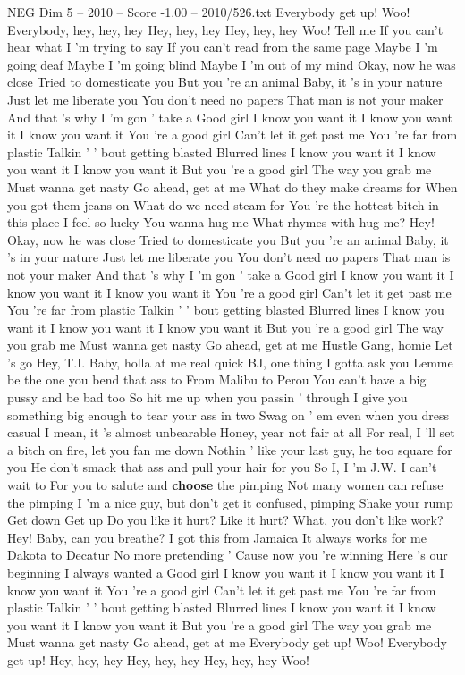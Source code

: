 \begin{textsample}{NEG Dim 5 – 2010 – Score -1.00 – 2010/526.txt}  \label{ex:f5_neg_013}
Everybody get up!
Woo!
Everybody, hey, hey, hey Hey, hey, hey Hey, hey, hey Woo!
Tell me If you can't hear what I 'm trying to say If you can't read from the same page Maybe I 'm going deaf Maybe I 'm going blind Maybe I 'm out of my mind Okay, now he was close Tried to domesticate you But you 're an animal Baby, it 's in your nature Just let me liberate you You don't need no papers That man is not your maker And that 's why I 'm gon ' take a Good girl I know you want it I know you want it I know you want it You 're a good girl Can't let it get past me You 're far from plastic Talkin ' ' bout getting blasted Blurred lines I know you want it I know you want it I know you want it But you 're a good girl The way you grab me Must wanna get nasty Go ahead, get at me What do they make dreams for When you got them jeans on What do we need steam for You 're the hottest bitch in this place I feel so lucky You wanna hug me What rhymes with hug me?
Hey!
Okay, now he was close Tried to domesticate you But you 're an animal Baby, it 's in your nature Just let me liberate you You don't need no papers That man is not your maker And that 's why I 'm gon ' take a Good girl I know you want it I know you want it I know you want it You 're a good girl Can't let it get past me You 're far from plastic Talkin ' ' bout getting blasted Blurred lines I know you want it I know you want it I know you want it But you 're a good girl The way you grab me Must wanna get nasty Go ahead, get at me Hustle Gang, homie Let 's go Hey, T.I.
Baby, holla at me real quick BJ, one thing I gotta ask you Lemme be the one you bend that ass to From Malibu to Perou You can't have a big pussy and be bad too So hit me up when you passin ' through I give you something big enough to tear your ass in two Swag on ' em even when you dress casual I mean, it 's almost unbearable Honey, year not fair at all For real, I 'll set a bitch on fire, let you fan me down Nothin ' like your last guy, he too square for you He don't smack that ass and pull your hair for you So I, I 'm J.W.
I can't wait to For you to salute and \textbf{choose} the pimping Not many women can refuse the pimping I 'm a nice guy, but don't get it confused, pimping Shake your rump Get down Get up Do you like it hurt?
Like it hurt?
What, you don't like work?
Hey!
Baby, can you breathe?
I got this from Jamaica It always works for me Dakota to Decatur No more pretending ' Cause now you 're winning Here 's our beginning I always wanted a Good girl I know you want it I know you want it I know you want it You 're a good girl Can't let it get past me You 're far from plastic Talkin ' ' bout getting blasted Blurred lines I know you want it I know you want it I know you want it But you 're a good girl The way you grab me Must wanna get nasty Go ahead, get at me Everybody get up!
Woo!
Everybody get up!
Hey, hey, hey Hey, hey, hey Hey, hey, hey Woo!

\end{textsample}
